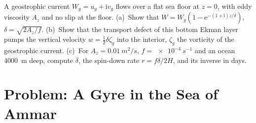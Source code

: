 \begin{exercise}[$\star\star\star$]\label{exo:b3:ocean-dynamics:12}
A geostrophic current $W_g = u_g + \mathrm iv_g$ flows over a flat sea
floor at $z = 0$, with eddy viscosity $A_z$ and no slip at the floor.
(a)~Show that $W = W_g(1 - \mathrm e^{-(1+\mathrm i)z/\delta})$, $\delta =
\sqrt{2A_z/f}$. (b)~Show that the transport defect of this bottom Ekman
layer pumps the vertical velocity $w = \tfrac12\delta\zeta_g$ into the
interior, $\zeta_g$ the vorticity of the geostrophic current. (c)~For
$A_z = \qty{0.01}{m^2/s}$, $f = \qty{e-4}{s^{-1}}$ and an ocean
\qty{4000}{m} deep, compute $\delta$, the spin-down rate $r =
f\delta/2H$, and its inverse in days.
\end{exercise}

\section{Problem: A Gyre in the Sea of Ammar}

